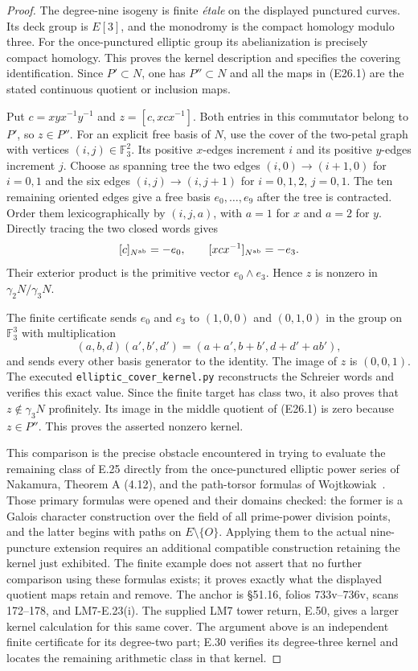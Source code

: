 \documentclass[11pt,oneside]{article}
\begin{document}
\begin{proof}
The degree-nine isogeny is finite \emph{\'etale} on the
displayed punctured curves. Its deck group is $E[3]$,
and the monodromy is the compact homology modulo three.
For the once-punctured elliptic group its abelianization
is precisely compact homology. This proves the kernel
description and specifies the covering identification.
Since $P'\subset N$, one has $P''\subset N$ and all
the maps in (E26.1) are the stated continuous quotient
or inclusion maps.

Put $c=xyx^{-1}y^{-1}$ and
$z=[c,xcx^{-1}]$. Both entries in this commutator
belong to $P'$, so $z\in P''$.
For an explicit free basis of $N$, use the cover of the
two-petal graph with vertices $(i,j)\in\mathbb F_3^2$.
Its positive $x$-edges increment $i$ and its positive
$y$-edges increment $j$. Choose as spanning tree the
two edges $(i,0)\to(i+1,0)$ for $i=0,1$ and the six
edges $(i,j)\to(i,j+1)$ for $i=0,1,2$, $j=0,1$.
The ten remaining oriented edges give a free basis
$e_0,\ldots,e_9$ after the tree is contracted.
Order them lexicographically by $(i,j,a)$, with
$a=1$ for $x$ and $a=2$ for $y$. Directly tracing the
two closed words gives
\[
 [c]_{N^{\rm ab}}=-e_0,\qquad
 [xcx^{-1}]_{N^{\rm ab}}=-e_3.
\]
Their exterior product is the primitive vector
$e_0\wedge e_3$. Hence $z$ is nonzero in
$\gamma_2N/\gamma_3N$.

The finite certificate sends $e_0$ and $e_3$ to
$(1,0,0)$ and $(0,1,0)$ in the group on
$\mathbb F_3^3$ with multiplication
\[
 (a,b,d)(a',b',d')=(a+a',b+b',d+d'+ab'),
\]
and sends every other basis generator to the identity.
The image of $z$ is $(0,0,1)$. The executed
\texttt{elliptic\_cover\_kernel.py} reconstructs the
Schreier words and verifies this exact value. Since
the finite target has class two, it also proves that
$z\notin\gamma_3N$ profinitely. Its image in the
middle quotient of (E26.1) is zero because $z\in P''$.
This proves the asserted nonzero kernel.

This comparison is the precise obstacle encountered
in trying to evaluate the remaining class of E.25
directly from the once-punctured elliptic power series
of Nakamura, Theorem A (4.12), and the path-torsor
formulas of Wojtkowiak~\cite{Nakamura1995Elliptic,Wojtkowiak2004Paths}.
Those primary formulas were opened and their domains
checked: the former is a Galois character construction
over the field of all prime-power division points,
and the latter begins with paths on
$E\setminus\{O\}$. Applying them to the actual
nine-puncture extension requires an additional
compatible construction retaining the kernel just
exhibited. The finite example does not assert that
no further comparison using these formulas exists;
it proves exactly what the displayed quotient maps
retain and remove. The anchor is \S51.16, folios
733v--736v, scans 172--178, and LM7-E.23(i).
The supplied LM7 tower return, E.50, gives a larger
kernel calculation for this same cover. The argument
above is an independent finite certificate for its
degree-two part; E.30 verifies its degree-three kernel
and locates the remaining arithmetic class in that kernel.
\end{proof}
\end{document}

